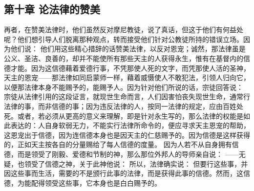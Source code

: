 
\subsection{第十章 论法律的赞美}

再者，在赞美法律时，他们虽然反对摩尼教徒，说了真话，但这于他们有何益处呢？他们想引导人们脱离那种观点，转而接受他们针对公教徒所持的错误立场。因为他们说： 他们用这些精心措辞的话赞美法律，以反对恩宠；诚然，那法律虽是公义、圣洁、良善的，却并不能使所有那些天主的人获得永生，惟有在基督内的信德才能。因为这信德藉着爱德行事，不凭那使人死的文字，而凭那使人活的圣神，天主的恩宠——那法律如同启蒙师一样，藉着威慑使人不敢犯法，引领人归向它，以便那法律本身不能赐予的，能赐予人。因为针对他们所说的话，宗徒回答说：          宗徒从法律引用的这段证言，就现世生命而言，人们因害怕丧失现世生命，通常行法律的事，而非信德的事；因为违反法律的人，按同一法律的规定，应由百姓处死。或者，若必须从更高的意义来理解，即是针对永生写的，那么法律的权能是如此表达的：人自身软弱无力，不能实行法律所命令的，便应寻求天主恩宠的帮助，这恩宠出于信德，因为连信德本身也是因天主的仁慈赐予的。因为信德是这样获得的，正如天主按各自的分量赐给了每人信德的度量。 因为人若不从自身拥有信德，而是领受了刚毅、爱德和节制的神，那么那位外邦人的导师亲自说：  ——无疑，也领受了信德之神，关于此神他说：  所以，法律确实说： 但要行这些事，并因这些事而生活，需要的不是颁行此事的法律，而是获得此事的信德。然而，这信德，为能配得领受这些事，它本身也是白白赐予的。\par


